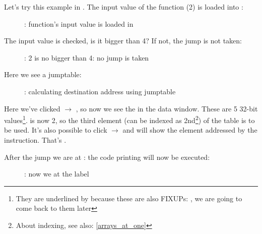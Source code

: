﻿\clearpage
\mysubparagraph{\olly}
\myindex{\olly}

Let's try this example in \olly.
The input value of the function (2) is loaded into \EAX: 

\begin{figure}[H]
\centering
{}
\caption{\olly: function's input value is loaded in \EAX}
\label{fig:switch_lot_olly1}
\end{figure}

\clearpage
The input value is checked, is it bigger than 4? 
If not, the  jump is not taken:
\begin{figure}[H]
\centering
{}
\caption{\olly: 2 is no bigger than 4: no jump is taken}
\label{fig:switch_lot_olly2}
\end{figure}

\clearpage
Here we see a jumptable:

\begin{figure}[H]
\centering
{}
\caption{\olly: calculating destination address using jumptable}
\label{fig:switch_lot_olly3}
\end{figure}

Here we've clicked  $\rightarrow$ , so now we see the  in the data window.
These are 5 32-bit values\footnote{They are underlined by \olly because
these are also FIXUPs: , we are going to come back to them later}.
\ECX is now 2, so the third element (can be indexed as 2nd\footnote{About indexing, see also: \ref{arrays_at_one}}) of the table is to be used.
It's also possible to click  $\rightarrow$ 
 and \olly will show the element addressed by the \JMP instruction. 
That's .

\clearpage
After the jump we are at : the code printing  will now be executed:

\begin{figure}[H]
\centering
{}
\caption{\olly: now we at the  label}
\label{fig:switch_lot_olly4}
\end{figure}
